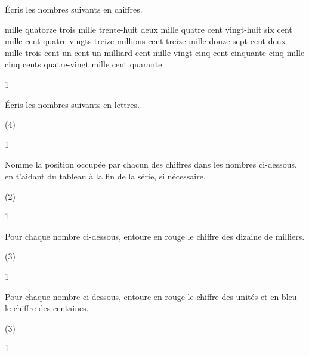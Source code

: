 \documentclass[a4paper,11pt]{report}
\begin{document}
\begin{exo}{ Écris les nombres suivants en chiffres.
\begin{tasks}[after-item-skip = 0.5em]
\task mille quatorze 
\task  trois mille trente-huit
\task deux mille quatre cent vingt-huit          
\task six cent mille cent quatre-vingts 
\task treize millions cent treize mille douze    
\task sept cent deux mille trois cent un 
\task cent un milliard cent mille vingt           
\task cinq cent cinquante-cinq mille cinq cents 
\task quatre-vingt mille cent quarante            
\end{tasks}
}{1}\end{exo}


\begin{exo}{ Écris les nombres suivants en lettres.
\begin{tasks}[after-item-skip = 0.5em](4)
              
            
       
     
              
            
\end{tasks}

}{1}\end{exo}



\begin{exo}{ Nomme la position occupée par chacun des chiffres dans les nombres ci-dessous, en t'aidant du tableau à la fin de la série, si nécessaire.
\begin{tasks}[after-item-skip = 0.5em](2)
\end{tasks}

}{1}\end{exo}
\begin{exop}{ Pour chaque nombre ci-dessous, entoure en rouge le chiffre des dizaine de milliers.
\begin{tasks}[after-item-skip = 0.5em](3)
\end{tasks}

}{1}\end{exop}
\begin{exop}{ Pour chaque nombre ci-dessous, entoure en rouge le chiffre des  unités et en bleu le chiffre des centaines.
\begin{tasks}[after-item-skip = 0.5em](3)
\end{tasks}

}{1}\end{exop}
\end{document}
